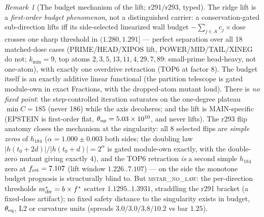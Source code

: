 \documentclass[11pt]{article}
\theoremstyle{definition}
\theoremstyle{remark}
\newtheorem{remark}[theorem]{Remark}
\begin{document}
\begin{remark}[The budget mechanism of the lift; r291/r293, typed]
\label{rem:budget}
The ridge lift is a \emph{first-order budget phenomenon}, not a
distinguished carrier: a conservation-gated sub-direction lifts iff
its side-selected linearized wall budget $-\sum_{j\in A}c_j\times$dose
crosses one sharp threshold in $(1.280, 1.291]$ --- perfect separation
over all 18 matched-dose cases (PRIME/HEAD/XIPOS lift,
POWER/MID/TAIL/XINEG do not; $k_{\min} = 9$, top atoms
$2,3,5,13,11,4,29,7,89$: small-prime head-heavy, not one-atom), with
exactly one overdrive retraction (TOP6 at factor 8).  The budget
itself is an exactly additive linear functional (the partition
telescope is gated module-own in exact Fractions, with the
dropped-atom mutant loud).  There is \emph{no fixed point}: the
step-controlled iteration saturates on the one-degree plateau
$\min C = 185$ (never 186) while the axis decoheres; and the lift is
MAIN-specific (EPSTEIN is first-order flat, $\theta_{\rm up} =
5.03\times10^{10}$, and never lifts).  The r293 flip anatomy closes
the mechanism at the singularity: all 8 selected flips are
\emph{simple zeros} of $h_{184}$ ($\alpha = 1.000\pm0.003$ both
sides; the doubling law $|h(t_0+2d)|/|h(t_0+d)| = 2^{\alpha}$ is
gated module-own exactly, with the double-zero mutant giving exactly
$4$), and the TOP6 retraction \emph{is} a second simple $h_{184}$
zero at $f_{\rm ret} = 7.107$ (lift window $1.226..7.107$) --- on the
side the monotone budget prognosis is structurally blind to.  But
\textsc{mstar\_no\_law}: the per-direction thresholds
$m^*_{\rm dir} = b\times f^*$ scatter $1.1295..1.3931$, straddling
the r291 bracket (a fixed-dose artifact); no fixed safety distance to
the singularity exists in budget, $\theta_{\rm eq}$, L2 or curvature
units (spreads $3.0/3.0/3.8/10.2$ vs bar $1.25$).
\end{remark}
\end{document}
